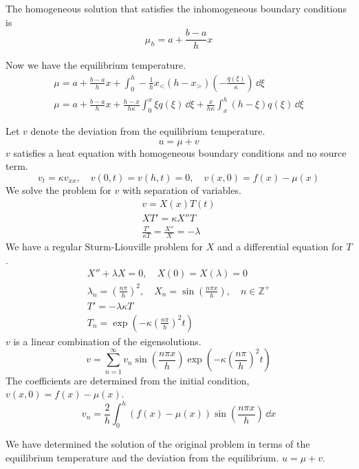 {\begin{Solution}
  The homogeneous solution that satisfies the inhomogeneous boundary
  conditions is
  \[
  \mu_h = a + \frac{b - a}{h} x
  \]

  Now we have the equilibrium temperature.
  \begin{gather*}
    \mu = a + \frac{b - a}{h} x
    + \int_0^h - \frac{1}{h} x_< \left( h - x_> \right) \left( - \frac{q(\xi)}{\kappa} \right)
    \,\dd \xi
    \\
    \mu = a + \frac{b - a}{h} x
    + \frac{h-x}{h \kappa} \int_0^x \xi q(\xi) \,\dd \xi
    + \frac{x}{h \kappa} \int_x^h (h-\xi) q(\xi) \,\dd \xi
  \end{gather*}


  Let $v$ denote the deviation from the equilibrium temperature.
  \[
  u = \mu + v
  \]
  $v$ satisfies a heat equation with homogeneous boundary conditions and no 
  source term.
  \[
  v_t = \kappa v_{x x}, \quad
  v(0,t) = v(h,t) = 0, \quad
  v(x,0) = f(x) - \mu(x)
  \]
  We solve the problem for $v$ with separation of variables.
  \begin{gather*}
    v = X(x) T(t)
    \\
    X T' = \kappa X'' T
    \\
    \frac{T'}{\kappa T} = \frac{X''}{X} = - \lambda
  \end{gather*}
  We have a regular Sturm-Liouville problem for $X$ and a differential equation
  for $T$.
  \begin{gather*}
    X'' + \lambda X = 0, \quad X(0) = X(\lambda) = 0
    \\
    \lambda_n = \left( \frac{n \pi}{h} \right)^2, \quad
    X_n = \sin \left( \frac{n \pi x}{h} \right), \quad
    n \in \mathbb{Z}^+
    \\
    T' = - \lambda \kappa T
    \\
    T_n = \exp \left( - \kappa \left( \frac{n \pi}{h} \right)^2 t \right)
  \end{gather*}
  $v$ is a linear combination of the eigensolutions.
  \[
  v = \sum_{n = 1}^\infty v_n \sin \left( \frac{n \pi x}{h} \right)
  \exp \left( - \kappa \left( \frac{n \pi}{h} \right)^2 t \right)
  \]
  The coefficients are determined from the initial condition, 
  $v(x,0) = f(x) - \mu(x)$.
  \[
  v_n = \frac{2}{h} \int_0^h (f(x) - \mu(x)) \sin \left( \frac{n \pi x}{h} \right) \,\dd x
  \]

  We have determined the solution of the original problem in terms of the
  equilibrium temperature and the deviation from the equilibrium.
  $u = \mu + v$.
\end{Solution}






}
